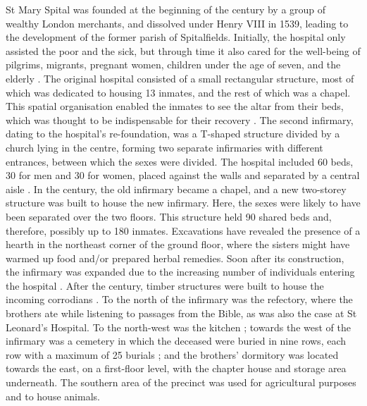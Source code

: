 \documentclass[%
	]{ijsra}
\renewcommand\AD{\xspace}
\begin{document}
St Mary Spital was founded at the beginning of the  century\AD by a group of wealthy London merchants, and dissolved under Henry VIII in 1539, leading to the development of the former parish of Spitalfields. Initially, the hospital only assisted the poor and the sick, but through time it also cared for the well-being of pilgrims, migrants, pregnant women, children under the age of seven, and the elderly \parencites[26]{Phillpotts_1997}[48-49]{Thomas_2002}{Unknown_1957}[60-61]{White_2007}.
The original hospital consisted of a small rectangular structure, most of which was dedicated to housing 13 inmates, and the rest of which was a chapel. This spatial organisation enabled the inmates to see the altar from their beds, which was thought to be indispensable for their recovery \parencites[91]{Phillpotts_1997}[98]{Thomas_2002}.
The second infirmary, dating to the hospital’s re-foundation, was a T-shaped structure divided by a church lying in the centre, forming two separate infirmaries with different entrances, between which the sexes were divided. The hospital included 60 beds, 30 for men and 30 for women, placed against the walls and separated by a central aisle \parencites[37]{Phillpotts_1997}[99]{Thomas_2002}. 
In the  century\AD, the old infirmary became a chapel, and a new two-storey structure was built to house the new infirmary. Here, the sexes were likely to have been separated over the two floors. This structure held 90 shared beds and, therefore, possibly up to 180 inmates.
Excavations have revealed the presence of a hearth in the northeast corner of the ground floor, where the sisters might have warmed up food and/or prepared herbal remedies. Soon after its construction, the infirmary was expanded due to the increasing number of individuals entering the hospital \parencites[47]{Phillpotts_1997}[99]{Thomas_2002}[59]{White_2007}. 
After the  century\AD, timber structures were built to house the incoming corrodians \parencite[104,152]{Thomas_2002}.
To the north of the infirmary was the refectory, where the brothers ate while listening to passages from the Bible, as was also the case at St Leonard’s Hospital. 
To the north-west was the kitchen \parencites[51]{Phillpotts_1997}[100]{Thomas_2002}; 
towards the west of the infirmary was a cemetery in which the deceased were buried in nine rows, each row with a maximum of 25 burials \parencite[59]{White_2007}; and the brothers’ dormitory was located towards the east, on a first-floor level, with the chapter house and storage area underneath. The southern area of the precinct was used for agricultural purposes and to house animals.
\end{document}
